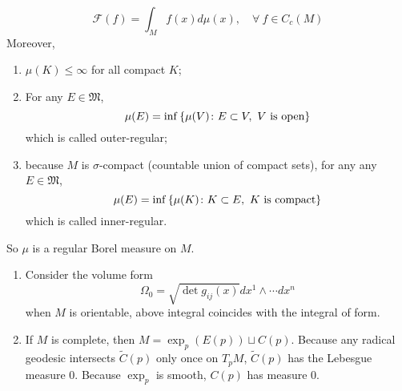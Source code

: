 \begin{enumerate}[label=\arabic{*}]
	\begin{equation*}
		\mathcal{F}(f) = \int_Mf(x)d\mu(x),\quad \forall~f\in C_c(M)
	\end{equation*}
	Moreover,
	\begin{enumerate}[label=(\arabic{*})]
		\item $\mu(K) \leq \infty$ for all compact $K$;
		\item For any $E \in \mathfrak{M}$,
		\begin{equation*}
			\mu(E) = \inf \left\{\mu(V) \colon E \subset V,~V \text{ is open}\right\}
		\end{equation*}
		which is called outer-regular;
		\item because $M$ is $\sigma$-compact (countable union of compact sets), for any any $E \in \mathfrak{M}$,
		\begin{equation*}
			\mu(E) = \inf \left\{\mu(K) \colon K \subset E,~K \text{ is compact}\right\}
		\end{equation*}
		which is called inner-regular.
	\end{enumerate}
	So $\mu$ is a regular Borel measure on $M$.
	\begin{rmk}
	 	\begin{enumerate}[label=(\roman{*})]
	 		\item Consider the volume form
	 		\begin{equation*}
	 			\Omega_0 = \sqrt{\det g_{ij}(x)} dx^1\wedge \cdots dx^n
	 		\end{equation*}
	 		when $M$ is orientable, above integral coincides with the integral of form.

	 		\item If $M$ is complete, then $M = \exp_p(E(p))\sqcup C(p)$. Because any radical geodesic intersects $\tilde{C}(p)$ only once on $T_pM$, $\tilde{C}(p)$ has the Lebesgue measure $0$. Because $\exp_p$ is smooth, $C(p)$ has measure $0$.
	 	\end{enumerate}
	\end{rmk}


\end{enumerate}

